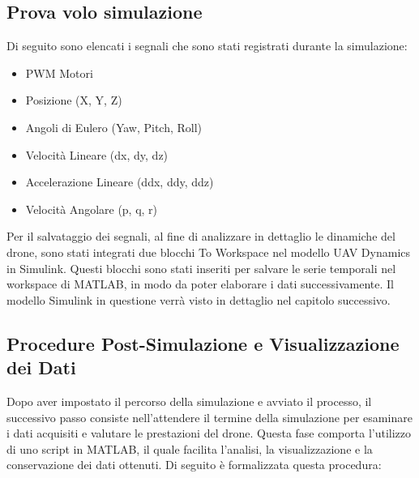 \subsection{Prova volo simulazione}
Di seguito sono elencati i segnali che sono stati registrati durante la simulazione:
\begin{itemize}
    \item PWM Motori
    \item Posizione (X, Y, Z)
    \item Angoli di Eulero (Yaw, Pitch, Roll)
    \item Velocità Lineare (dx, dy, dz)
    \item Accelerazione Lineare (ddx, ddy, ddz)
    \item Velocità Angolare (p, q, r)
\end{itemize}

Per il salvataggio dei segnali, al fine di analizzare in dettaglio le dinamiche del drone, sono stati integrati due blocchi To Workspace nel modello UAV Dynamics in Simulink. Questi blocchi sono stati inseriti per salvare le serie temporali nel workspace di MATLAB, in modo da poter elaborare i dati successivamente. Il modello Simulink in questione verrà visto in dettaglio nel capitolo successivo.


\subsection{Procedure Post-Simulazione e Visualizzazione dei Dati}

Dopo aver impostato il percorso della simulazione e avviato il processo, il successivo passo consiste nell'attendere il termine della simulazione per esaminare i dati acquisiti e valutare le prestazioni del drone. Questa fase comporta l'utilizzo di uno script in MATLAB, il quale facilita l'analisi, la visualizzazione e la conservazione dei dati ottenuti. Di seguito è formalizzata questa procedura:

